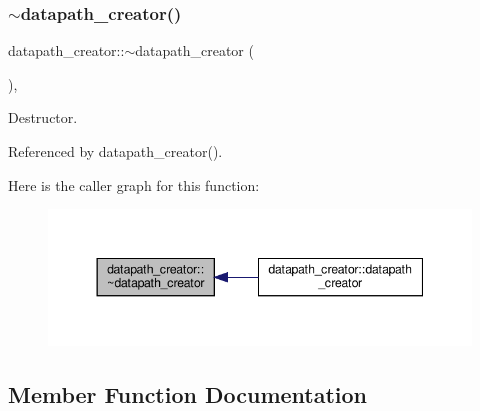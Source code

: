 \subsubsection{\texorpdfstring{$\sim$datapath\+\_\+creator()}{~datapath\_creator()}}
{\footnotesize\ttfamily datapath\+\_\+creator\+::$\sim$datapath\+\_\+creator (\begin{DoxyParamCaption}{ }\end{DoxyParamCaption})\hspace{0.3cm}{\ttfamily [override]}, {\ttfamily [default]}}



Destructor. 



Referenced by datapath\+\_\+creator().

Here is the caller graph for this function\+:
\nopagebreak
\begin{figure}[H]
\begin{center}
\leavevmode
\includegraphics[width=344pt]{dd/d45/classdatapath__creator_a1787dd3af42d845b50187fc6b8f1900c_icgraph}
\end{center}
\end{figure}


\subsection{Member Function Documentation}
\mbox{\label{classdatapath__creator_a7fb5e5ffd9ede6b14c718b9304a8f1dd}} 
